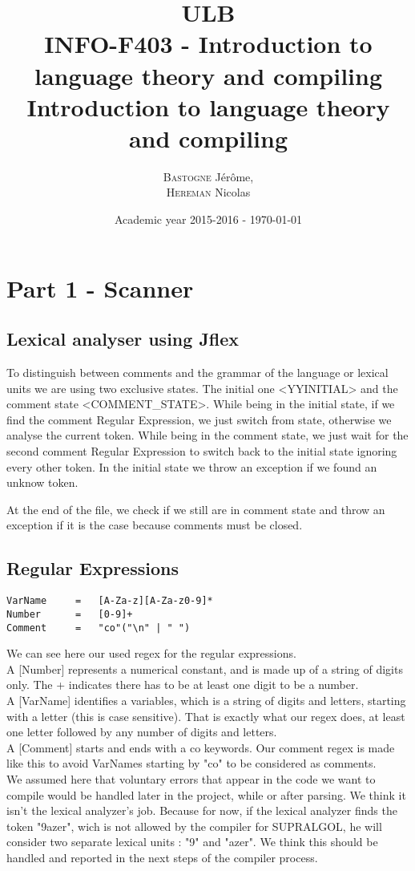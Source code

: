 \documentclass[a4paper,10pt]{report}
\title{ULB\\
        INFO-F403 - Introduction to language theory and compiling \\
            Introduction to language theory and compiling}
\author{\textsc{Bastogne} Jérôme,\\
        \textsc{Hereman} Nicolas}
\date{Academic year 2015-2016 - \today}
\begin{document}
\maketitle
\clearpage


\chapter{Part 1 - Scanner}

\section{Lexical analyser using Jflex}

To distinguish between comments and the grammar of the language or lexical units we are using two exclusive states. The initial one <YYINITIAL> and the comment state <COMMENT\_STATE>. While being in the initial state, if we find the comment Regular Expression, we just switch from state, otherwise we analyse the current token. While being in the comment state, we just wait for the second comment Regular Expression to switch back to the initial state ignoring every other token. In the initial state we throw an exception if we found an unknow token.

At the end of the file, we check if we still are in comment state and throw an exception if it is the case because comments must be closed.

\section{Regular Expressions}

\begin{lstlisting}
VarName		=	[A-Za-z][A-Za-z0-9]*
Number		=	[0-9]+
Comment		=	"co"("\n" | " ")
\end{lstlisting}
We can see here our used regex for the regular expressions.\\
A [Number] represents a numerical constant, and is made up of a string of digits only. The + indicates there has to be at least one digit to be a number.\\
A [VarName] identifies a variables, which is a string of digits and letters, starting with a letter (this is case sensitive). That is exactly what our regex does, at least one letter followed by any number of digits and letters.\\
A [Comment] starts and ends with a co keywords. Our comment regex is made like this to avoid VarNames starting by "co" to be considered as comments.\\
We assumed here that voluntary errors that appear in the code we want to compile would be handled later in the project, while or after parsing. We think it isn't the lexical analyzer's job. Because for now, if the lexical analyzer finds the token "9azer", wich is not allowed by the compiler for SUPRALGOL, he will consider two separate lexical units : "9" and "azer". We think this should be handled and reported in the next steps of the compiler process.
\end{document}
